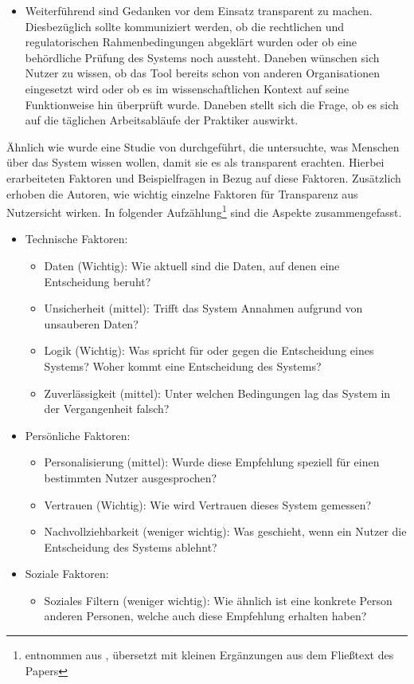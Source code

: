 \begin{itemize}
    \item Weiterführend sind Gedanken vor dem Einsatz transparent zu machen. Diesbezüglich sollte kommuniziert werden, ob die rechtlichen und regulatorischen Rahmenbedingungen abgeklärt wurden oder ob eine behördliche Prüfung des Systems noch aussteht. Daneben wünschen sich Nutzer zu wissen, ob das Tool bereits schon von anderen Organisationen eingesetzt wird oder ob es im wissenschaftlichen Kontext auf seine Funktionweise hin überprüft wurde. Daneben stellt sich die Frage, ob es sich auf die täglichen Arbeitsabläufe der Praktiker auswirkt.
\end{itemize}

Ähnlich wie \cite{cai2019hello} wurde eine Studie von \cite{vorm2018assessing} durchgeführt, die untersuchte, was Menschen über das System wissen wollen, damit sie es als transparent erachten. Hierbei erarbeiteten \cite{vorm2018assessing} Faktoren und Beispielfragen in Bezug auf diese Faktoren. Zusätzlich erhoben die Autoren, wie wichtig einzelne Faktoren für Transparenz aus Nutzersicht wirken. In folgender Aufzählung\footnote{entnommen aus \cite{cai2019hello}, übersetzt mit kleinen Ergänzungen aus dem Fließtext des Papers} sind die Aspekte zusammengefasst.
\begin{itemize}
    \item Technische Faktoren:
    \begin{itemize}
        \item Daten (Wichtig): Wie aktuell sind die Daten, auf denen eine Entscheidung beruht?
        \item Unsicherheit (mittel): Trifft das System Annahmen aufgrund von unsauberen Daten?
        \item Logik (Wichtig): Was spricht für oder gegen die Entscheidung eines Systems? Woher kommt eine Entscheidung des Systems?
        \item Zuverlässigkeit (mittel): Unter welchen Bedingungen lag das System in der Vergangenheit falsch?
    \end{itemize}
    \item Persönliche Faktoren:
    \begin{itemize}
        \item Personalisierung (mittel): Wurde diese Empfehlung speziell für einen bestimmten Nutzer ausgesprochen?
        \item Vertrauen (Wichtig): Wie wird Vertrauen dieses System gemessen?
        \item Nachvollziehbarkeit (weniger wichtig): Was geschieht, wenn ein Nutzer die Entscheidung des Systems ablehnt?
    \end{itemize}
    \item Soziale Faktoren:
    \begin{itemize}
        \item Soziales Filtern (weniger wichtig): Wie ähnlich ist eine konkrete Person anderen Personen, welche auch diese Empfehlung erhalten haben?
    \end{itemize}
\end{itemize}
